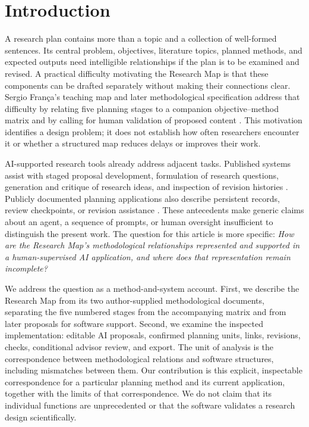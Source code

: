 \section{Introduction}
\label{sec:introduction}

A research plan contains more than a topic and a collection of well-formed sentences. Its central problem, objectives, literature topics, planned methods, and expected outputs need intelligible relationships if the plan is to be examined and revised. A practical difficulty motivating the Research Map is that these components can be drafted separately without making their connections clear. Sergio Fran\c{c}a's teaching map and later methodological specification address that difficulty by relating five planning stages to a companion objective--method matrix and by calling for human validation of proposed content \cite{franca2026map,franca2026detail}. This motivation identifies a design problem; it does not establish how often researchers encounter it or whether a structured map reduces delays or improves their work.

AI-supported research tools already address adjacent tasks. Published systems assist with staged proposal development, formulation of research questions, generation and critique of research ideas, and inspection of revision histories \cite{guerard2026researchllm,wang2026fivestage,liu2024coquest,baek2025researchagent,freire2006vistrails}. Publicly documented planning applications also describe persistent records, review checkpoints, or revision assistance \cite{projectready2026guide,researchly2026site}. These antecedents make generic claims about an agent, a sequence of prompts, or human oversight insufficient to distinguish the present work. The question for this article is more specific: \emph{How are the Research Map's methodological relationships represented and supported in a human-supervised AI application, and where does that representation remain incomplete?}

We address the question as a method-and-system account. First, we describe the Research Map from its two author-supplied methodological documents, separating the five numbered stages from the accompanying matrix and from later proposals for software support. Second, we examine the inspected implementation: editable AI proposals, confirmed planning units, links, revisions, checks, conditional advisor review, and export. The unit of analysis is the correspondence between methodological relations and software structures, including mismatches between them. Our contribution is this explicit, inspectable correspondence for a particular planning method and its current application, together with the limits of that correspondence. We do not claim that its individual functions are unprecedented or that the software validates a research design scientifically.

